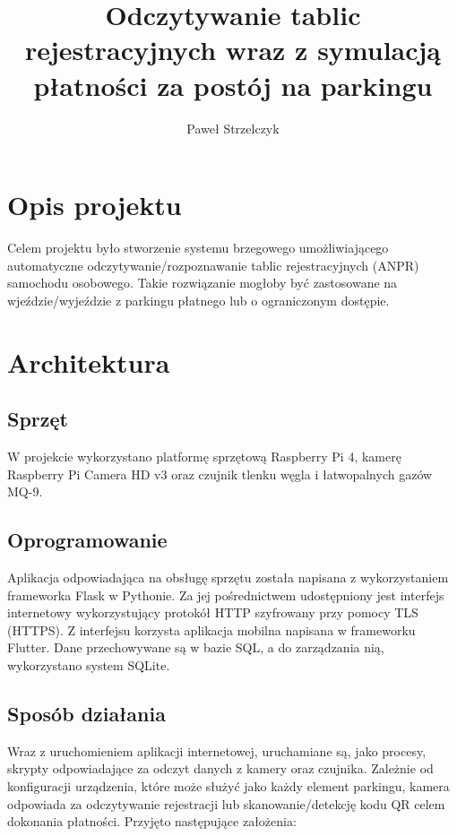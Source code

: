 \documentclass[a4paper, 11pt]{article}
\title{
   Odczytywanie tablic rejestracyjnych wraz z symulacją płatności za postój na parkingu
}
\date{}
\author{Paweł Strzelczyk}
\begin{document}
\maketitle

\section{Opis projektu}

Celem projektu było stworzenie systemu brzegowego umożliwiającego automatyczne odczytywanie/rozpoznawanie tablic rejestracyjnych (ANPR) samochodu osobowego. Takie rozwiązanie mogłoby być zastosowane na wjeździe/wyjeździe z parkingu płatnego lub o ograniczonym dostępie. 

\section{Architektura}

\subsection{Sprzęt}

W projekcie wykorzystano platformę sprzętową Raspberry Pi 4, kamerę Raspberry Pi Camera HD v3 oraz czujnik tlenku węgla i łatwopalnych gazów MQ-9. 

\subsection{Oprogramowanie}

Aplikacja odpowiadająca na obsługę sprzętu została napisana z wykorzystaniem frameworka Flask w Pythonie. Za jej pośrednictwem udostępniony jest interfejs internetowy wykorzystujący protokół HTTP szyfrowany przy pomocy TLS (HTTPS). Z interfejsu korzysta aplikacja mobilna napisana w frameworku Flutter. Dane przechowywane są w bazie SQL, a do zarządzania nią, wykorzystano system SQLite.

\subsection{Sposób działania}

Wraz z uruchomieniem aplikacji internetowej, uruchamiane są, jako procesy, skrypty odpowiadające za odczyt danych z kamery oraz czujnika. Zależnie od konfiguracji urządzenia, które może służyć jako każdy element parkingu, kamera odpowiada za odczytywanie rejestracji lub skanowanie/detekcję kodu QR celem dokonania płatności. Przyjęto następujące założenia:
\end{document}
